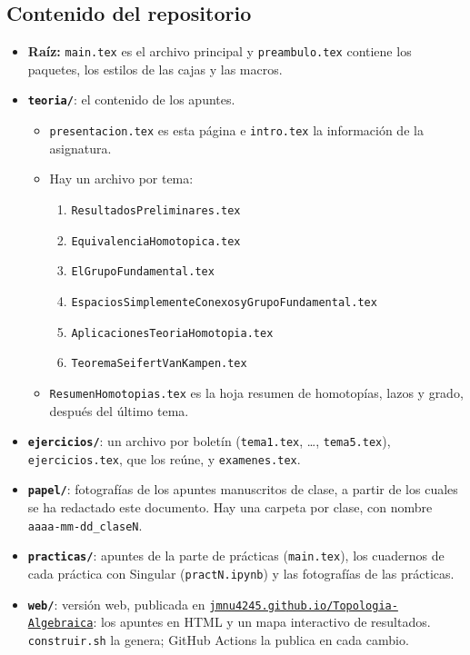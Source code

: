 \subsection*{Contenido del repositorio}
\begin{itemize}
    \item \textbf{Raíz:} \texttt{main.tex} es el archivo principal y \texttt{preambulo.tex} contiene los paquetes, los estilos de las cajas y las macros.
    \item \textbf{\texttt{teoria/}}: el contenido de los apuntes.
    \begin{itemize}
        \item \texttt{presentacion.tex} es esta página e \texttt{intro.tex} la información de la asignatura.
        \item Hay un archivo por tema:
        \begin{enumerate}
            \item \texttt{ResultadosPreliminares.tex}
            \item \texttt{EquivalenciaHomotopica.tex}
            \item \texttt{ElGrupoFundamental.tex}
            \item \texttt{EspaciosSimplementeConexosyGrupoFundamental.tex}
            \item \texttt{AplicacionesTeoriaHomotopia.tex}
            \item \texttt{TeoremaSeifertVanKampen.tex}
        \end{enumerate}
        \item \texttt{ResumenHomotopias.tex} es la hoja resumen de homotopías, lazos y grado, después del último tema.
    \end{itemize}
    \item \textbf{\texttt{ejercicios/}}: un archivo por boletín (\texttt{tema1.tex}, \dots, \texttt{tema5.tex}), \texttt{ejercicios.tex}, que los reúne, y \texttt{examenes.tex}.
    \item \textbf{\texttt{papel/}}: fotografías de los apuntes manuscritos de clase, a partir de los cuales se ha redactado este documento. Hay una carpeta por clase, con nombre \texttt{aaaa-mm-dd\_claseN}.
    \item \textbf{\texttt{practicas/}}: apuntes de la parte de prácticas (\texttt{main.tex}), los cuadernos de cada práctica con Singular (\texttt{practN.ipynb}) y las fotografías de las prácticas.
    \item \textbf{\texttt{web/}}: versión web, publicada en \href{https://jmnu4245.github.io/Topologia-Algebraica/}{\texttt{jmnu4245.github.io/Topologia-Algebraica}}: los apuntes en HTML y un mapa interactivo de resultados. \texttt{construir.sh} la genera; GitHub Actions la publica en cada cambio.

\end{itemize}
